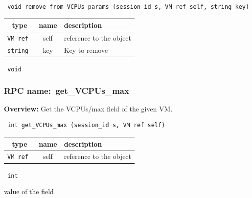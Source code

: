 \begin{verbatim} void remove_from_VCPUs_params (session_id s, VM ref self, string key)\end{verbatim}



 
\vspace{0.3cm}
\begin{tabular}{|c|c|p{7cm}|}
 \hline
{\bf type} & {\bf name} & {\bf description} \\ \hline
{\tt VM ref } & self & reference to the object \\ \hline 

{\tt string } & key & Key to remove \\ \hline 

\end{tabular}

\vspace{0.3cm}

{\tt 
void
}



\vspace{0.3cm}
\vspace{0.3cm}
\vspace{0.3cm}
\subsubsection{RPC name:~get\_VCPUs\_max}

{\bf Overview:} 
Get the VCPUs/max field of the given VM.

\begin{verbatim} int get_VCPUs_max (session_id s, VM ref self)\end{verbatim}



 
\vspace{0.3cm}
\begin{tabular}{|c|c|p{7cm}|}
 \hline
{\bf type} & {\bf name} & {\bf description} \\ \hline
{\tt VM ref } & self & reference to the object \\ \hline 

\end{tabular}

\vspace{0.3cm}

{\tt 
int
}


value of the field
\vspace{0.3cm}
\vspace{0.3cm}
\vspace{0.3cm}
